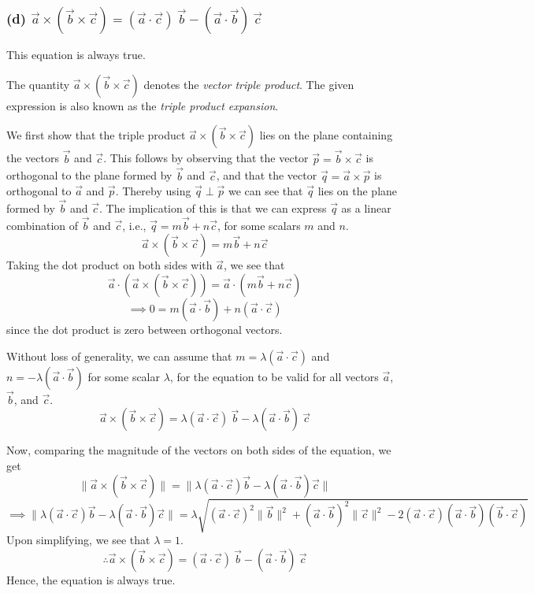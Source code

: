 \subsubsection*{(d) \( \vec{a} \times (\vec{b} \times \vec{c}) = (\vec{a} \cdot \vec{c})\ \vec{b} - (\vec{a} \cdot \vec{b})\ \vec{c} \)}

This equation is always true.

The quantity \( \vec{a} \times (\vec{b} \times \vec{c}) \) denotes the \textit{vector triple product}.
The given expression is also known as the \textit{triple product expansion}.

We first show that the triple product \( \vec{a} \times (\vec{b} \times \vec{c}) \) lies on the plane containing the vectors \( \vec{b} \) and  \( \vec{c} \).
This follows by observing that the vector \( \vec{p} = \vec{b} \times \vec{c}\) is orthogonal to the plane formed by \( \vec{b} \) and  \( \vec{c} \), and that the vector \( \vec{q} = \vec{a} \times \vec{p} \) is orthogonal to \( \vec{a} \) and \( \vec{p} \).
Thereby using \( \vec{q} \perp \vec{p} \) we can see that \( \vec{q} \) lies on the plane formed by \( \vec{b} \) and  \( \vec{c} \).
The implication of this is that we can express \( \vec{q} \) as a linear combination of \( \vec{b} \) and  \( \vec{c} \), i.e., \( \vec{q} = m\vec{b} + n\vec{c} \), for some scalars \( m \) and \( n \).
\begin{equation*}
    \vec{a} \times (\vec{b} \times \vec{c}) = m\vec{b} + n\vec{c}
\end{equation*}
Taking the dot product on both sides with \( \vec{a} \), we see that
\[
    \vec{a} \cdot (\vec{a} \times (\vec{b} \times \vec{c})) = \vec{a} \cdot (m\vec{b} + n\vec{c})
\]
\[
    \implies 0 = m(\vec{a} \cdot \vec{b}) + n(\vec{a} \cdot \vec{c})
\]
since the dot product is zero between orthogonal vectors.

Without loss of generality, we can assume that \( m = \lambda(\vec{a} \cdot \vec{c}) \) and \( n = -\lambda(\vec{a} \cdot \vec{b}) \) for some scalar \( \lambda \), for the equation to be valid for all vectors \( \vec{a} \), \( \vec{b} \), and \( \vec{c} \).
\begin{equation*}
    \vec{a} \times (\vec{b} \times \vec{c}) = \lambda (\vec{a} \cdot \vec{c})\ \vec{b} - \lambda (\vec{a} \cdot \vec{b})\ \vec{c}
\end{equation*}

Now, comparing the magnitude of the vectors on both sides of the equation, we get
\[
    \lVert \vec{a} \times (\vec{b} \times \vec{c}) \rVert
    = \lVert \lambda (\vec{a} \cdot \vec{c}) \vec{b} - \lambda (\vec{a} \cdot \vec{b}) \vec{c} \rVert
\]
\[
    \implies
    \lVert \lambda (\vec{a} \cdot \vec{c}) \vec{b} - \lambda (\vec{a} \cdot \vec{b}) \vec{c} \rVert
    = \lambda \sqrt{ {(\vec{a} \cdot \vec{c})}^2 \lVert \vec{b} \rVert ^2 + {(\vec{a} \cdot \vec{b})}^2 \lVert \vec{c} \rVert ^2 - 2 (\vec{a} \cdot \vec{c})(\vec{a} \cdot \vec{b})(\vec{b} \cdot \vec{c}) }
\]
Upon simplifying, we see that \( \lambda = 1 \).
\[
    \therefore \vec{a} \times (\vec{b} \times \vec{c}) = (\vec{a} \cdot \vec{c})\ \vec{b} - (\vec{a} \cdot \vec{b})\ \vec{c}
\]
Hence, the equation is always true.
